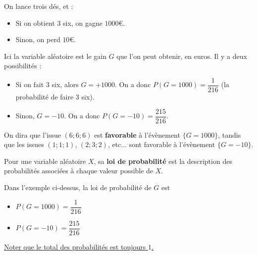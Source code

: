 \documentclass[
	classe=$1^{ere}STI2D$
]{coursclass}
\begin{document}
\begin{exemple}
	On lance trois dés, et :
	\begin{itemize}
		\item Si on obtient $3$ six, on gagne $1000$€.
		\item Sinon, on perd $10$€.
	\end{itemize}
	Ici la variable aléatoire est le gain $G$ que l'on peut obtenir, en euros. Il y a deux possibilités :
	\begin{itemize}
		\item Si on fait $3$ six, alors $G = +1000$. On a donc $P(G = 1000) = \dfrac{1}{216}$ (la probabilité de faire $3$ six).
		\item Sinon, $G = -10$. On a donc $P(G = -10) = \dfrac{215}{216}$.
	\end{itemize}

	On dira que l'issue $(6 ; 6 ; 6)$ est \textbf{favorable} à l'évènement $\{G = 1000\}$, tandis que les issues $(1 ; 1 ; 1)$, $(2 ; 3 ; 2)$, etc... sont favorable à l'évènement $\{G = -10\}$.
\end{exemple}

\begin{definition}
	Pour une variable aléatoire $X$, sa \textbf{loi de probabilité} est la description des probabilités associées à chaque valeur possible de $X$.
\end{definition}

\begin{exemple}
	Dans l'exemple ci-dessus, la loi de probabilité de $G$ est
	\begin{itemize}
		\item $P(G = 1000) = \dfrac{1}{216}$
		\item $P(G = -10) = \dfrac{215}{216}$
	\end{itemize}

	\uline{Noter que le total des probabilités est toujours $1$.}
\end{exemple}
\end{document}

